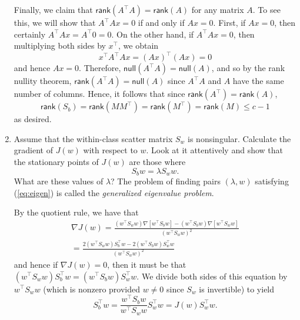 \documentclass{../kin_math}
\begin{document}
\begin{questions}
\begin{enumerate}[label=\arabic*.]
\begin{solution}
      Finally, we claim that $\textsf{rank}(A^\top A) = \textsf{rank}(A)$ for any matrix $A$. To see this, we will show that $A^\top A x = 0$ if and only if $A x = 0$. First, if $Ax = 0$, then certainly $A^\top Ax = A^\top 0 = 0$. On the other hand, if $A^\top A x = 0$, then multiplying both sides by $x^\top$, we obtain
      \begin{equation*}
        x^\top A^\top A x = (Ax)^\top (Ax) = 0
      \end{equation*}
      and hence $Ax = 0$. Therefore, $\textsf{null}(A^\top A) = \textsf{null}(A)$, and so by the rank nullity theorem, $\textsf{rank}(A^\top A) = \textsf{null}(A)$ since $A^\top A$ and $A$ have the same number of columns. Hence, it follows that since $\textsf{rank}(A^\top) = \textsf{rank}(A)$,
      \begin{equation*}
        \textsf{rank}(S_b) = \textsf{rank}(MM^\top) = \textsf{rank}(M^\top) = \textsf{rank}(M) \leq c - 1
      \end{equation*}
      as desired.
    \end{solution}
    \item Assume that the within-class scatter matrix $S_w$ is nonsingular. Calculate the gradient of $J(w)$ with respect to $w$. Look at it attentively and show that the stationary points of $J(w)$ are those where
    \begin{equation}
      \label{eq:eigen}
      S_b w = \lambda S_w w.
    \end{equation}
    What are these values of $\lambda$? The problem of finding pairs $(\lambda, w)$ satisfying (\ref{eq:eigen}) is called the \emph{generalized eigenvalue problem}.
    \begin{solution}
      By the quotient rule, we have that
      \begin{multline*}
        \nabla J(w) = \frac{(w^\top S_w w) \nabla [w^\top S_b w] - (w^\top S_b w) \nabla [w^\top S_w w]}{(w^\top S_w w)^2} \\
        = \frac{2 (w^\top S_w w) S_b^\top w - 2 (w^\top S_b w) S_w^\top w}{(w^\top S_w w)^2}
      \end{multline*}
      and hence if $\nabla J(w) = 0$, then it must be that $(w^\top S_w w) S_b^\top w = (w^\top S_b w) S_w^\top w$. We divide both sides of this equation by $w^\top S_w w$ (which is nonzero provided $w \neq 0$ since $S_w$ is invertible) to yield
      \begin{equation*}
        S_b^\top w = \frac{w^\top S_b w}{w^\top S_w w} S_w^\top w = J(w) S_w^\top w.
      \end{equation*}

\end{solution}
\end{enumerate}
\end{questions}
\end{document}
